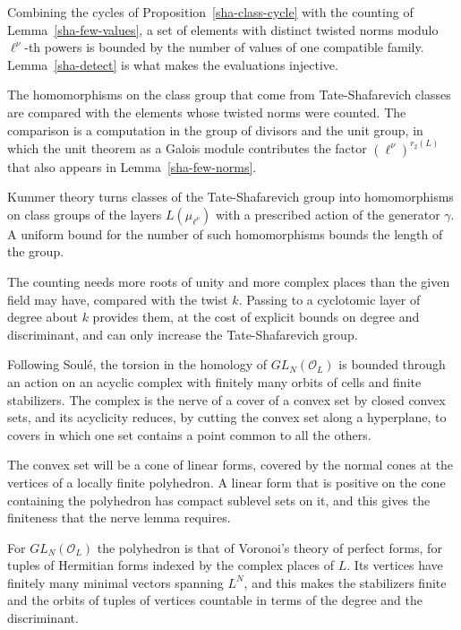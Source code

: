Combining the cycles of Proposition~\ref{sha-class-cycle} with the counting of Lemma~\ref{sha-few-values}, a set of elements with distinct twisted norms modulo $\ell^\nu$-th powers is bounded by the number of values of one compatible family. Lemma~\ref{sha-detect} is what makes the evaluations injective.

The homomorphisms on the class group that come from Tate-Shafarevich classes are compared with the elements whose twisted norms were counted. The comparison is a computation in the group of divisors and the unit group, in which the unit theorem as a Galois module contributes the factor $(\ell^\nu)^{r_2(L)}$ that also appears in Lemma~\ref{sha-few-norms}.

Kummer theory turns classes of the Tate-Shafarevich group into homomorphisms on class groups of the layers $L(\mu_{\ell^\nu})$ with a prescribed action of the generator $\gamma$. A uniform bound for the number of such homomorphisms bounds the length of the group.

The counting needs more roots of unity and more complex places than the given field may have, compared with the twist $k$. Passing to a cyclotomic layer of degree about $k$ provides them, at the cost of explicit bounds on degree and discriminant, and can only increase the Tate-Shafarevich group.

Following Soulé, the torsion in the homology of $GL_N(\mathcal O_L)$ is bounded through an action on an acyclic complex with finitely many orbits of cells and finite stabilizers. The complex is the nerve of a cover of a convex set by closed convex sets, and its acyclicity reduces, by cutting the convex set along a hyperplane, to covers in which one set contains a point common to all the others.

The convex set will be a cone of linear forms, covered by the normal cones at the vertices of a locally finite polyhedron. A linear form that is positive on the cone containing the polyhedron has compact sublevel sets on it, and this gives the finiteness that the nerve lemma requires.

For $GL_N(\mathcal O_L)$ the polyhedron is that of Voronoi's theory of perfect forms, for tuples of Hermitian forms indexed by the complex places of $L$. Its vertices have finitely many minimal vectors spanning $L^N$, and this makes the stabilizers finite and the orbits of tuples of vertices countable in terms of the degree and the discriminant.

